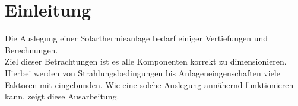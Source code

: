 \section{Einleitung}
\label{sec:Einleitung}
Die Auslegung einer Solarthermieanlage bedarf einiger Vertiefungen und Berechnungen.\\
Ziel dieser Betrachtungen ist es alle Komponenten korrekt zu dimensionieren.
Hierbei werden von Strahlungsbedingungen bis Anlageneingenschaften viele Faktoren mit eingebunden.
Wie eine solche Auslegung annähernd funktionieren kann, zeigt diese Ausarbeitung.

